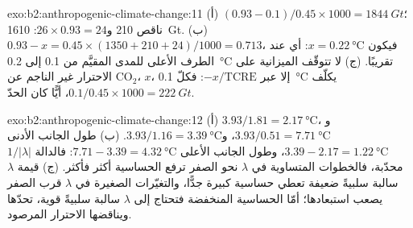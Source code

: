 \begin{solution}{exo:b2:anthropogenic-climate-change:11}
(أ) $(0.93 - 0.1)/0.45 \times 1000 = \qty{1844}{Gt}$؛ ناقص 210 و$26 \times 0.93 = 24$:
\qty{1610}{Gt}. (ب) $0.93 - x = 0.45 \times (1350 + 210 + 24)/1000 = 0.713$، فيكون $x =
\qty{0.22}{\celsius}$: أي عند الطرف الأعلى للمدى المقيَّم من 0.1 إلى \qty{0.2}{\celsius} تقريبًا. (ج) لا
تتوقّف الميزانية على الاحترار غير الناجم عن CO$_2$، $x$، إلا عبر $-x/\text{TCRE}$: فكلّ
\qty{0.1}{\celsius} يكلّف $0.1/0.45 \times 1000 = \qty{222}{Gt}$، أيًّا كان الحدّ.
\end{solution}

\begin{solution}{exo:b2:anthropogenic-climate-change:12}
(أ) $3.93/1.81 = \qty{2.17}{\celsius}$، و$3.93/0.51 = \qty{7.71}{\celsius}$، و$3.93/1.16 =
\qty{3.39}{\celsius}$. (ب) طول الجانب الأدنى $3.39 - 2.17 = \qty{1.22}{\celsius}$، وطول الجانب الأعلى
$7.71 - 3.39 = \qty{4.32}{\celsius}$: فالدالة $1/|\lambda|$ محدّبة، فالخطوات المتساوية في
$\lambda$ نحو الصفر ترفع الحساسية أكثر فأكثر. (ج) قيمة $\lambda$ سالبة سلبيةً ضعيفة تعطي حساسية
كبيرة جدًّا، والتغيّرات الصغيرة في $\lambda$ قرب الصفر يصعب استبعادها؛ أمّا الحساسية المنخفضة فتحتاج إلى $\lambda$
سالبة سلبيةً قوية، تحدّها  ويناقضها الاحترار المرصود.
\end{solution}

